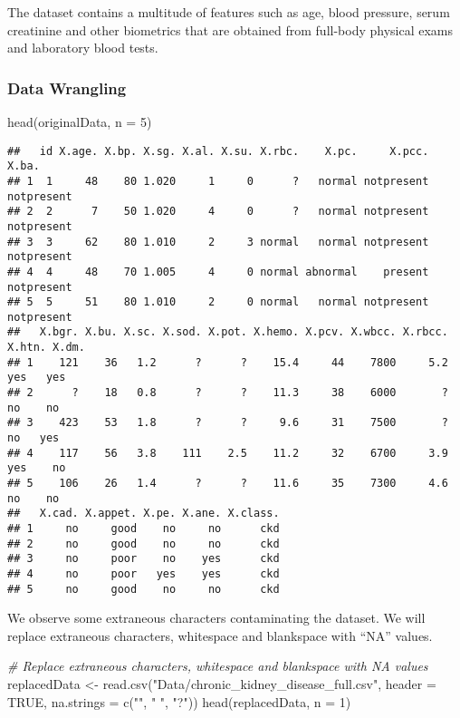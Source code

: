 \documentclass[
]{article}
\newenvironment{Shaded}{\begin{snugshade}}{\end{snugshade}}
\newcommand{\AttributeTok}[1]{\textcolor[rgb]{0.77,0.63,0.00}{#1}}
\newcommand{\CommentTok}[1]{\textcolor[rgb]{0.56,0.35,0.01}{\textit{#1}}}
\newcommand{\ConstantTok}[1]{\textcolor[rgb]{0.00,0.00,0.00}{#1}}
\newcommand{\DecValTok}[1]{\textcolor[rgb]{0.00,0.00,0.81}{#1}}
\newcommand{\FunctionTok}[1]{\textcolor[rgb]{0.00,0.00,0.00}{#1}}
\newcommand{\NormalTok}[1]{#1}
\newcommand{\OtherTok}[1]{\textcolor[rgb]{0.56,0.35,0.01}{#1}}
\newcommand{\StringTok}[1]{\textcolor[rgb]{0.31,0.60,0.02}{#1}}
\begin{document}
The dataset contains a multitude of features such as age, blood
pressure, serum creatinine and other biometrics that are obtained from
full-body physical exams and laboratory blood tests.

\hypertarget{data-wrangling}{%
\subsubsection{Data Wrangling}\label{data-wrangling}}

\begin{Shaded}
\begin{Highlighting}[]
\FunctionTok{head}\NormalTok{(originalData, }\AttributeTok{n =} \DecValTok{5}\NormalTok{)}
\end{Highlighting}
\end{Shaded}

\begin{verbatim}
##   id X.age. X.bp. X.sg. X.al. X.su. X.rbc.    X.pc.     X.pcc.      X.ba.
## 1  1     48    80 1.020     1     0      ?   normal notpresent notpresent
## 2  2      7    50 1.020     4     0      ?   normal notpresent notpresent
## 3  3     62    80 1.010     2     3 normal   normal notpresent notpresent
## 4  4     48    70 1.005     4     0 normal abnormal    present notpresent
## 5  5     51    80 1.010     2     0 normal   normal notpresent notpresent
##   X.bgr. X.bu. X.sc. X.sod. X.pot. X.hemo. X.pcv. X.wbcc. X.rbcc. X.htn. X.dm.
## 1    121    36   1.2      ?      ?    15.4     44    7800     5.2    yes   yes
## 2      ?    18   0.8      ?      ?    11.3     38    6000       ?     no    no
## 3    423    53   1.8      ?      ?     9.6     31    7500       ?     no   yes
## 4    117    56   3.8    111    2.5    11.2     32    6700     3.9    yes    no
## 5    106    26   1.4      ?      ?    11.6     35    7300     4.6     no    no
##   X.cad. X.appet. X.pe. X.ane. X.class.
## 1     no     good    no     no      ckd
## 2     no     good    no     no      ckd
## 3     no     poor    no    yes      ckd
## 4     no     poor   yes    yes      ckd
## 5     no     good    no     no      ckd
\end{verbatim}

We observe some extraneous characters contaminating the dataset. We will
replace extraneous characters, whitespace and blankspace with ``NA''
values.

\begin{Shaded}
\begin{Highlighting}[]
\CommentTok{\# Replace extraneous characters, whitespace and blankspace with NA values}
\NormalTok{replacedData }\OtherTok{\textless{}{-}} \FunctionTok{read.csv}\NormalTok{(}\StringTok{"Data/chronic\_kidney\_disease\_full.csv"}\NormalTok{, }
    \AttributeTok{header =} \ConstantTok{TRUE}\NormalTok{, }\AttributeTok{na.strings =} \FunctionTok{c}\NormalTok{(}\StringTok{""}\NormalTok{, }\StringTok{" "}\NormalTok{, }\StringTok{"?"}\NormalTok{))}
\FunctionTok{head}\NormalTok{(replacedData, }\AttributeTok{n =} \DecValTok{1}\NormalTok{)}
\end{Highlighting}
\end{Shaded}
\end{document}
